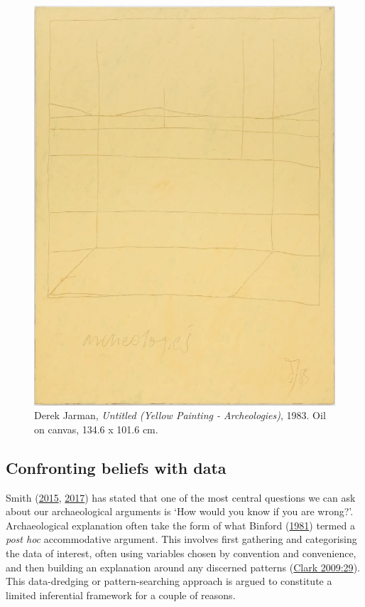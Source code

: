 \documentclass[
  a4paper,
  oneside]{uiophdthesis}
\begin{document}
\begin{figure}

{\centering \includegraphics[width=1\linewidth]{figures/jarman} 

}

\caption{Derek Jarman, \textit{Untitled (Yellow Painting - Archeologies)}, 1983. Oil on canvas, 134.6 x 101.6 cm.}\label{fig:jarman}
\end{figure}

\hypertarget{confronting-beliefs-with-data}{%
\subsection{Confronting beliefs with data}\label{confronting-beliefs-with-data}}

Smith (\protect\hyperlink{ref-smith2015}{2015}, \protect\hyperlink{ref-smith2017}{2017}) has stated that one of the most central questions we can ask about our archaeological arguments is `How would you know if you are wrong?'. Archaeological explanation often take the form of what Binford (\protect\hyperlink{ref-binford1981}{1981}) termed a \emph{post hoc} accommodative argument. This involves first gathering and categorising the data of interest, often using variables chosen by convention and convenience, and then building an explanation around any discerned patterns (\protect\hyperlink{ref-clark2009}{Clark 2009:29}). This data-dredging or pattern-searching approach is argued to constitute a limited inferential framework for a couple of reasons.
\end{document}
